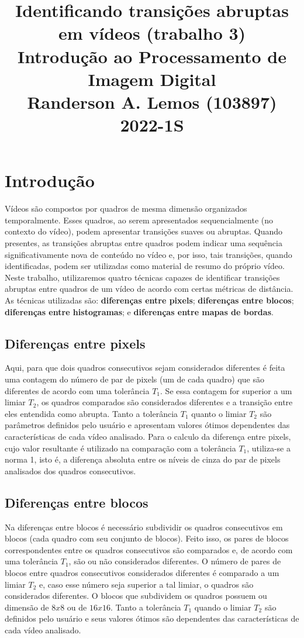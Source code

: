\documentclass{article}
\title{
	Identificando transições abruptas em vídeos (trabalho 3) \\
	\Large Introdução ao Processamento de Imagem Digital \\
	Randerson A. Lemos (103897)
	2022-1S
}
\date{\vspace{-5ex}}
\begin{document}
  \maketitle

%
\section{Introdução}
Vídeos são compostos por quadros de mesma dimensão organizados temporalmente. Esses quadros, ao serem apresentados sequencialmente (no contexto do vídeo), podem apresentar transições suaves ou abruptas. Quando presentes, as transições abruptas entre quadros podem indicar uma sequência significativamente nova de conteúdo no vídeo e, por isso, tais transições, quando identificadas, podem ser utilizadas como material de resumo do próprio vídeo. Neste trabalho, utilizaremos quatro técnicas capazes de identificar transições abruptas entre quadros de um vídeo de acordo com certas métricas de distância. As técnicas utilizadas são: \textbf{diferenças entre pixels}; \textbf{diferenças entre blocos}; \textbf{diferenças entre histogramas}; e \textbf{diferenças entre mapas de bordas}.

\subsection{Diferenças entre pixels}
Aqui, para que dois quadros consecutivos sejam considerados diferentes é feita uma contagem do número de par de pixels (um de cada quadro) que são diferentes de acordo com uma tolerância $T_1$. Se essa contagem for superior a um limiar $T_2$, os quadros comparados são considerados diferentes e a transição entre eles entendida como abrupta. Tanto a tolerância $T_1$ quanto o limiar $T_2$ são parâmetros definidos pelo usuário e apresentam valores ótimos dependentes das características de cada vídeo analisado. Para o calculo da diferença entre pixels, cujo valor resultante é utilizado na comparação com a tolerância $T_1$, utiliza-se a norma 1, isto é, a diferença absoluta entre os níveis de cinza do par de pixels analisados dos quadros consecutivos.


\subsection{Diferenças entre blocos}
Na diferenças entre blocos é necessário subdividir os quadros consecutivos em blocos (cada quadro com seu conjunto de blocos). Feito isso, os pares de blocos correspondentes entre os quadros consecutivos são comparados e, de acordo com uma tolerância $T_1$, são ou não considerados diferentes. O número de pares de blocos entre quadros consecutivos considerados diferentes é comparado a um limiar $T_2$ e, caso esse número seja superior a tal limiar, o quadros são considerados diferentes. O blocos que subdividem os quadros possuem ou dimensão de $8x8$ ou de $16x16$. Tanto a tolerância $T_1$ quando o limiar $T_2$ são definidos pelo usuário e seus valores ótimos são dependentes das características de cada vídeo analisado.
\end{document}
